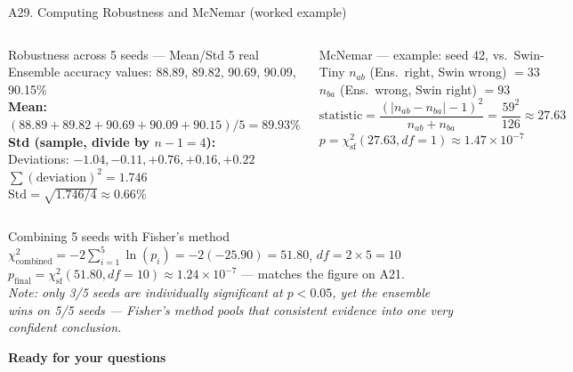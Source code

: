 \documentclass[10pt, aspectratio=169]{beamer}
\begin{document}
\begin{frame}{A29. Computing Robustness and McNemar (worked example)}
    \scriptsize
    \begin{columns}[T]
        \begin{block}{Robustness across 5 seeds --- Mean/Std}
            \scriptsize
            5 real Ensemble accuracy values: 88.89, 89.82, 90.69, 90.09, 90.15\%\\[3pt]
            \textbf{Mean:} $(88.89{+}89.82{+}90.69{+}90.09{+}90.15)/5 = 89.93\%$\\[3pt]
            \textbf{Std (sample, divide by $n{-}1{=}4$):}\\
            Deviations: $-1.04, -0.11, +0.76, +0.16, +0.22$\\
            $\sum (\text{deviation})^2 = 1.746$\\
            $\mathrm{Std} = \sqrt{1.746/4} \approx 0.66\%$
        \end{block}

        \begin{block}{McNemar --- example: seed 42, vs.\ Swin-Tiny}
            \scriptsize
            $n_{ab}$ (Ens.\ right, Swin wrong) $=33$\\
            $n_{ba}$ (Ens.\ wrong, Swin right) $=93$\\[3pt]
            $\text{statistic} = \dfrac{(|n_{ab}-n_{ba}|-1)^2}{n_{ab}+n_{ba}} = \dfrac{59^2}{126} \approx 27.63$\\[3pt]
            $p = \chi^2_{\text{sf}}(27.63, df{=}1) \approx 1.47{\times}10^{-7}$
        \end{block}
    \end{columns}

    \vspace{0.2cm}
    \begin{block}{Combining 5 seeds with Fisher's method}
        \scriptsize
        $\chi^2_{\text{combined}} = -2\sum_{i=1}^{5}\ln(p_i) = -2(-25.90) = 51.80$, $df=2{\times}5=10$\\
        $p_{\text{final}} = \chi^2_{\text{sf}}(51.80, df{=}10) \approx 1.24{\times}10^{-7}$ --- matches the figure on A21.\\
        \textit{Note: only 3/5 seeds are individually significant at $p<0.05$, yet the ensemble wins on 5/5 seeds --- Fisher's method pools that consistent evidence into one very confident conclusion.}
    \end{block}
\end{frame}

\begin{frame}[plain]
    \centering
    \vspace{2cm}
    {\Huge \textbf{\textcolor{usthblue}{Ready for your questions}}}\\[1cm]
    \\[1cm]
\end{frame}
\end{document}
